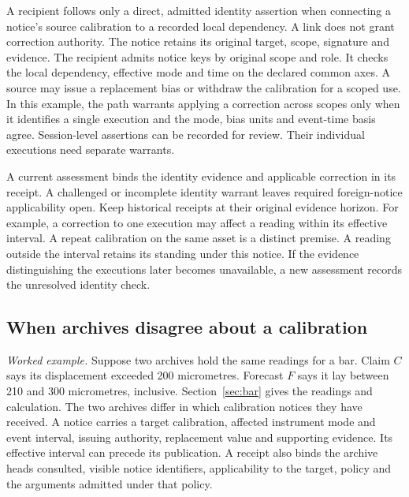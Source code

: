 \documentclass[11pt,a4paper]{article}
\newcommand{\topic}[1]{\par\smallskip{\sffamily\bfseries\color{ink}#1\par}\nobreak}
\begin{document}
\topic{Using an admitted link}
A recipient follows only a direct, admitted identity assertion when connecting a notice's source calibration to a recorded local dependency. A link does not grant correction authority. The notice retains its original target, scope, signature and evidence. The recipient admits notice keys by original scope and role. It checks the local dependency, effective mode and time on the declared common axes. A source may issue a replacement bias or withdraw the calibration for a scoped use. In this example, the path warrants applying a correction across scopes only when it identifies a single execution and the mode, bias units and event-time basis agree. Session-level assertions can be recorded for review. Their individual executions need separate warrants.

A current assessment binds the identity evidence and applicable correction in its receipt. A challenged or incomplete identity warrant leaves required foreign-notice applicability open. Keep historical receipts at their original evidence horizon. For example, a correction to one execution may affect a reading within its effective interval. A repeat calibration on the same asset is a distinct premise. A reading outside the interval retains its standing under this notice. If the evidence distinguishing the executions later becomes unavailable, a new assessment records the unresolved identity check.

\clearpage
{}
\subsection*{When archives disagree about a calibration}\label{sec:rivals}
\textit{Worked example.} Suppose two archives hold the same readings for a bar. Claim $C$ says its displacement exceeded 200 micrometres. Forecast $F$ says it lay between 210 and 300 micrometres, inclusive. Section~\ref{sec:bar} gives the readings and calculation. The two archives differ in which calibration notices they have received. A notice carries a target calibration, affected instrument mode and event interval, issuing authority, replacement value and supporting evidence. Its effective interval can precede its publication. A receipt also binds the archive heads consulted, visible notice identifiers, applicability to the target, policy and the arguments admitted under that policy.
\end{document}

